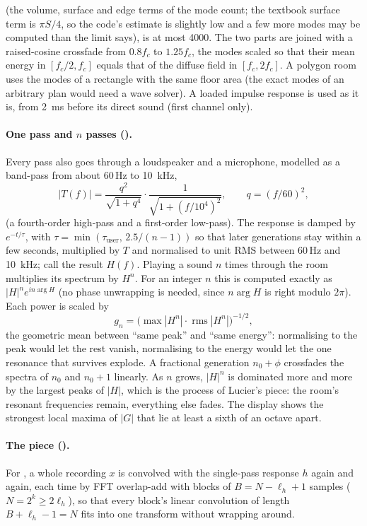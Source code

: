 (the volume, surface and edge terms of the mode count; the textbook surface term is $\pi S/4$, so the code's estimate
is slightly low and a few more modes may be computed than the limit says), is at most 4000. The two parts are joined with a raised-cosine
crossfade from $0.8f_c$ to $1.25f_c$, the modes scaled so that their mean energy in $[f_c/2, f_c]$ equals that of the
diffuse field in $[f_c, 2f_c]$. A polygon room uses the modes of a rectangle with the same floor area (the exact modes
of an arbitrary plan would need a wave solver). A loaded impulse response is used as it is, from \SI{2}{ms} before its
direct sound (first channel only).

\paragraph{One pass and $n$ passes ().} Every pass also goes through a loudspeaker and a microphone,
modelled as a band-pass from about 60\,Hz to \SI{10}{kHz},
\begin{equation}
  |T(f)| = \frac{q^2}{\sqrt{1+q^4}}\cdot\frac{1}{\sqrt{1+(f/10^4)^2}},\qquad q = (f/60)^2,
\end{equation}
(a fourth-order high-pass and a first-order low-pass). The response is damped by $e^{-t/\tau}$, with
$\tau = \min(\tau_\mathrm{user},\, 2.5/(n-1))$ so that later generations stay within a few seconds, multiplied by $T$
and normalised to unit RMS between 60\,Hz and \SI{10}{kHz}; call the result $H(f)$. Playing a sound $n$ times through
the room multiplies its spectrum by $H^n$. For an integer $n$ this is computed exactly as
$|H|^n e^{in\arg H}$ (no phase unwrapping is needed, since $n\arg H$ is right modulo $2\pi$). Each power is scaled by
\begin{equation}
  g_n = \bigl(\max|H^n|\cdot\operatorname{rms}|H^n|\bigr)^{-1/2},
\end{equation}
the geometric mean between \enquote{same peak} and \enquote{same energy}: normalising to the peak would let the rest
vanish, normalising to the energy would let the one resonance that survives explode. A fractional generation
$n_0+\phi$ crossfades the spectra of $n_0$ and $n_0+1$ linearly. As $n$ grows, $|H|^n$ is dominated more and more by
the largest peaks of $|H|$, which is the process of Lucier's piece: the room's resonant frequencies remain, everything
else fades. The display shows the strongest local maxima of $|G|$ that lie at least a sixth of an octave apart.

\paragraph{The piece ().} For , a whole recording $x$ is convolved with the single-pass response
$h$ again and again, each time by FFT overlap-add with blocks of $B = N-\ell_h+1$ samples ($N = 2^k\ge 2\ell_h$), so
that every block's linear convolution of length $B+\ell_h-1 = N$ fits into one transform without wrapping around.


